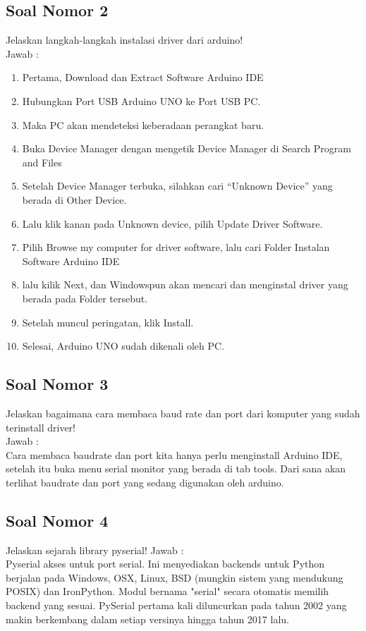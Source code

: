 \subsection{Soal Nomor 2}
Jelaskan langkah-langkah instalasi driver dari arduino!\\
Jawab :
\begin{enumerate}
\item Pertama, Download dan Extract Software Arduino IDE
\item Hubungkan Port USB Arduino UNO ke Port USB PC.
\item Maka PC akan mendeteksi keberadaan perangkat baru.
\item Buka Device Manager dengan mengetik Device Manager di Search Program and Files
\item Setelah Device Manager terbuka, silahkan cari “Unknown Device” yang berada di Other Device.
\item Lalu klik kanan pada Unknown device, pilih Update Driver Software.
\item Pilih Browse my computer for driver software, lalu cari Folder Instalan Software Arduino IDE
\item lalu kilik Next, dan Windowspun akan mencari dan menginstal driver yang berada pada Folder tersebut.
\item Setelah muncul peringatan, klik Install.
\item Selesai, Arduino UNO sudah dikenali oleh PC.
\end{enumerate}

\subsection{Soal Nomor 3}
Jelaskan bagaimana cara membaca baud rate dan port dari komputer yang sudah
terinstall driver! \\
Jawab :\\
Cara membaca baudrate dan port kita hanya perlu menginstall Arduino IDE, setelah itu buka menu serial monitor yang berada di tab tools. Dari sana akan terlihat baudrate dan port yang sedang digunakan oleh arduino.

\subsection{Soal Nomor 4}
Jelaskan sejarah library pyserial!
Jawab : \\
Pyserial akses untuk port serial. Ini menyediakan backends untuk Python berjalan pada Windows, OSX, Linux, BSD (mungkin sistem yang mendukung POSIX) dan IronPython. Modul bernama "serial" secara otomatis memilih backend yang sesuai. PySerial pertama kali diluncurkan pada tahun 2002 yang makin berkembang dalam setiap versinya hingga tahun 2017 lalu.

